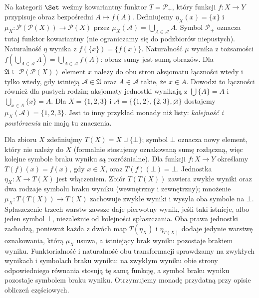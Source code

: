 \begin{przyklad}\label{przyklad:powerset-monad}
Na kategorii $\Set$ weźmy kowariantny funktor $T=\mathcal P_+$, który funkcji $f:X\to Y$ przypisuje obraz bezpośredni $A\mapsto f(A)$. Definiujemy $\eta_X(x)=\{x\}$ i $\mu_X:\mathcal P(\mathcal P(X))\to\mathcal P(X)$ przez $\mu_X(\mathscr A)=\bigcup_{A\in\mathscr A}A$. Symbol $\mathcal P_+$ oznacza tutaj funktor kowariantny (nie ograniczamy się do podzbiorów niepustych). Naturalność $\eta$ wynika z $f(\{x\})=\{f(x)\}$. Naturalność $\mu$ wynika z tożsamości $f(\bigcup_{A\in\mathscr A}A)=\bigcup_{A\in\mathscr A}f(A)$: obraz sumy jest sumą obrazów. Dla $\mathfrak A\subseteq\mathcal P(\mathcal P(X))$ element $x$ należy do obu stron aksjomatu łączności wtedy i tylko wtedy, gdy istnieją $\mathscr A\in\mathfrak A$ oraz $A\in\mathscr A$ takie, że $x\in A$. Dowodzi to łączności również dla pustych rodzin; aksjomaty jednostki wynikają z $\bigcup\{A\}=A$ i $\bigcup_{x\in A}\{x\}=A$. Dla $X=\{1,2,3\}$ i $\mathscr A=\{\{1,2\},\{2,3\},\varnothing\}$ dostajemy $\mu_X(\mathscr A)=\{1,2,3\}$. Jest to inny przykład monady niż listy: \emph{kolejność i powtórzenia} nie mają tu znaczenia.
\end{przyklad}

\begin{przyklad}
Dla zbioru $X$ zdefiniujmy $T(X)=X\sqcup\{\bot\}$; symbol $\bot$ oznacza nowy element, który nie należy do $X$ (formalnie stosujemy oznakowaną sumę rozłączną, więc kolejne symbole braku wyniku są rozróżnialne). Dla funkcji $f:X\to Y$ określamy $T(f)(x)=f(x)$, gdy $x\in X$, oraz $T(f)(\bot)=\bot$. Jednostka $\eta_X:X\to T(X)$ jest włączeniem. Zbiór $T(T(X))$ zawiera zwykłe wyniki oraz dwa rodzaje symbolu braku wyniku (wewnętrzny i zewnętrzny); mnożenie $\mu_X:T(T(X))\to T(X)$ zachowuje zwykłe wyniki i wysyła oba symbole na $\bot$. Spłaszczenie trzech warstw zawsze daje pierwotny wynik, jeśli taki istnieje, albo jeden symbol $\bot$, niezależnie od kolejności spłaszczania. Oba prawa jednostki zachodzą, ponieważ każda z dwóch map $T(\eta_X)$ i $\eta_{T(X)}$ dodaje jedynie warstwę oznakowania, którą $\mu_X$ usuwa, a istniejący brak wyniku pozostaje brakiem wyniku. Funktorialność i naturalność obu transformacji sprawdzamy na zwykłych wynikach i symbolach braku wyniku: na zwykłym wyniku obie strony odpowiedniego równania stosują tę samą funkcję, a symbol braku wyniku pozostaje symbolem braku wyniku. Otrzymujemy monadę przydatną przy opisie obliczeń częściowych.
\end{przyklad}

